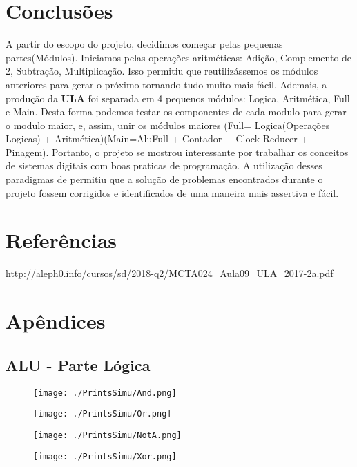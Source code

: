 

\section{Conclusões}
    A partir do escopo do projeto, decidimos começar pelas pequenas partes(Módulos). Iniciamos pelas operações aritméticas: Adição, Complemento de 2, Subtração, Multiplicação. Isso permitiu que reutilizássemos os módulos anteriores para gerar o próximo tornando tudo muito mais fácil.
    \newline
    Ademais, a produção da \textbf{ULA} foi separada em 4 pequenos módulos: Logica, Aritmética, Full e Main. Desta forma podemos testar os componentes de cada modulo para gerar o modulo maior, e, assim, unir os módulos maiores (Full= Logica(Operações Logicas) + Aritmética)(Main=AluFull + Contador + Clock Reducer + Pinagem).
    \newline
    Portanto, o projeto se mostrou interessante por trabalhar os conceitos de sistemas digitais com boas praticas de programação. A utilização desses paradigmas de permitiu que a solução de problemas encontrados durante o projeto fossem corrigidos e identificados de uma maneira mais assertiva e fácil. 
    
    
\section{Refer\^{e}ncias}

 \url{http://aleph0.info/cursos/sd/2018-q2/MCTA024\_Aula09\_ULA\_2017-2a.pdf}

\section{Apêndices}

\subsection{ ALU - Parte Lógica\newline} \label{ap:7.1}

\begin{figure}[H] %
    \centering
    \texttt{[image: ./PrintsSimu/And.png]}
\end{figure}
\begin{figure}[H] %
    \centering
    \texttt{[image: ./PrintsSimu/Or.png]}
\end{figure}
\begin{figure}[H] %
    \texttt{[image: ./PrintsSimu/NotA.png]}
\end{figure}
\begin{figure}[H] %
    \texttt{[image: ./PrintsSimu/Xor.png]}
\end{figure}

